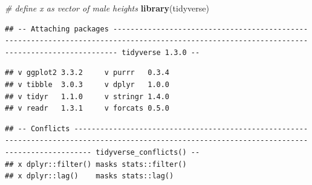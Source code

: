 \documentclass[
]{article}
\newenvironment{Shaded}{\begin{snugshade}}{\end{snugshade}}
\newcommand{\CommentTok}[1]{\textcolor[rgb]{0.56,0.35,0.01}{\textit{#1}}}
\newcommand{\DataTypeTok}[1]{\textcolor[rgb]{0.13,0.29,0.53}{#1}}
\newcommand{\DecValTok}[1]{\textcolor[rgb]{0.00,0.00,0.81}{#1}}
\newcommand{\KeywordTok}[1]{\textcolor[rgb]{0.13,0.29,0.53}{\textbf{#1}}}
\newcommand{\NormalTok}[1]{#1}
\newcommand{\OperatorTok}[1]{\textcolor[rgb]{0.81,0.36,0.00}{\textbf{#1}}}
\newcommand{\StringTok}[1]{\textcolor[rgb]{0.31,0.60,0.02}{#1}}
\begin{document}
\begin{Shaded}
\begin{Highlighting}[]
\CommentTok{# define x as vector of male heights}
\KeywordTok{library}\NormalTok{(tidyverse)}
\end{Highlighting}
\end{Shaded}

\begin{verbatim}
## -- Attaching packages --------------------------------------------------------------------------------------------------------------------------------------------- tidyverse 1.3.0 --
\end{verbatim}

\begin{verbatim}
## v ggplot2 3.3.2     v purrr   0.3.4
## v tibble  3.0.3     v dplyr   1.0.0
## v tidyr   1.1.0     v stringr 1.4.0
## v readr   1.3.1     v forcats 0.5.0
\end{verbatim}

\begin{verbatim}
## -- Conflicts ------------------------------------------------------------------------------------------------------------------------------------------------ tidyverse_conflicts() --
## x dplyr::filter() masks stats::filter()
## x dplyr::lag()    masks stats::lag()
\end{verbatim}

\begin{Shaded}
\end{Shaded}
\end{document}
